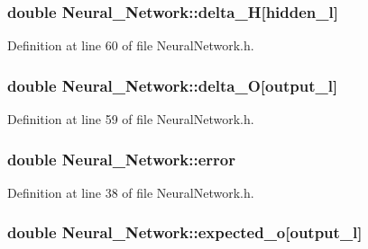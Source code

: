 \hypertarget{a00003_a51e5c2d2b53ba284c5b3791446c3b7d8}{
\subsubsection[{delta\-\_\-\-H}]{\setlength{\rightskip}{0pt plus 5cm}double Neural\-\_\-\-Network\-::delta\-\_\-\-H\mbox{[}{\bf hidden\-\_\-l}\mbox{]}\hspace{0.3cm}{\ttfamily [private]}}}\label{d1/d7c/a00003_a51e5c2d2b53ba284c5b3791446c3b7d8}


Definition at line 60 of file Neural\-Network.\-h.

\hypertarget{a00003_ae5f829ba5e65ae91d5c4feda5f66e37a}{
\subsubsection[{delta\-\_\-\-O}]{\setlength{\rightskip}{0pt plus 5cm}double Neural\-\_\-\-Network\-::delta\-\_\-\-O\mbox{[}{\bf output\-\_\-l}\mbox{]}\hspace{0.3cm}{\ttfamily [private]}}}\label{d1/d7c/a00003_ae5f829ba5e65ae91d5c4feda5f66e37a}


Definition at line 59 of file Neural\-Network.\-h.

\hypertarget{a00003_a2ffe42aee798e268d4bbf0f3428ba430}{
\subsubsection[{error}]{\setlength{\rightskip}{0pt plus 5cm}double Neural\-\_\-\-Network\-::error\hspace{0.3cm}{\ttfamily [private]}}}\label{d1/d7c/a00003_a2ffe42aee798e268d4bbf0f3428ba430}


Definition at line 38 of file Neural\-Network.\-h.

\hypertarget{a00003_a8d632cf69d2fcd076e473aba1ae74702}{
\subsubsection[{expected\-\_\-o}]{\setlength{\rightskip}{0pt plus 5cm}double Neural\-\_\-\-Network\-::expected\-\_\-o\mbox{[}{\bf output\-\_\-l}\mbox{]}\hspace{0.3cm}{\ttfamily [private]}}}\label{d1/d7c/a00003_a8d632cf69d2fcd076e473aba1ae74702}


